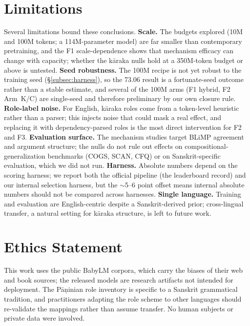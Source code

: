\documentclass[11pt]{article}
\begin{document}
\section*{Limitations}
Several limitations bound these conclusions. \textbf{Scale.} The budgets explored (10M and 100M tokens; a 114M-parameter model) are far smaller than contemporary pretraining, and the F1 scale-dependence shows that mechanism efficacy can change with capacity; whether the k\=araka nulls hold at a 350M-token budget or above is untested. \textbf{Seed robustness.} The 100M recipe is not yet robust to the training seed (\S\ref{subsec:harness}), so the 73.06 result is a fortunate-seed outcome rather than a stable estimate, and several of the 100M arms (F1 hybrid, F2 Arm~K/C) are single-seed and therefore preliminary by our own closure rule. \textbf{Role-label noise.} For English, k\=araka roles come from a token-level heuristic rather than a parser; this injects noise that could mask a real effect, and replacing it with dependency-parsed roles is the most direct intervention for F2 and F3. \textbf{Evaluation surface.} The mechanism studies target BLiMP agreement and argument structure; the nulls do not rule out effects on compositional-generalization benchmarks (COGS, SCAN, CFQ) or on Sanskrit-specific evaluation, which we did not run. \textbf{Harness.} Absolute numbers depend on the scoring harness; we report both the official pipeline (the leaderboard record) and our internal selection harness, but the $\sim$5--6 point offset means internal absolute numbers should not be compared across harnesses. \textbf{Single language.} Training and evaluation are English-centric despite a Sanskrit-derived prior; cross-lingual transfer, a natural setting for k\=araka structure, is left to future work.

\section*{Ethics Statement}
This work uses the public BabyLM corpora, which carry the biases of their web and book sources; the released models are research artifacts not intended for deployment. The P\=a\d{n}inian role inventory is specific to a Sanskrit grammatical tradition, and practitioners adapting the role scheme to other languages should re-validate the mappings rather than assume transfer. No human subjects or private data were involved.



\appendix
\renewcommand{\thesection}{Appendix~\Alph{section}}
\renewcommand{\sectionautorefname}{Appendix}
\end{document}
